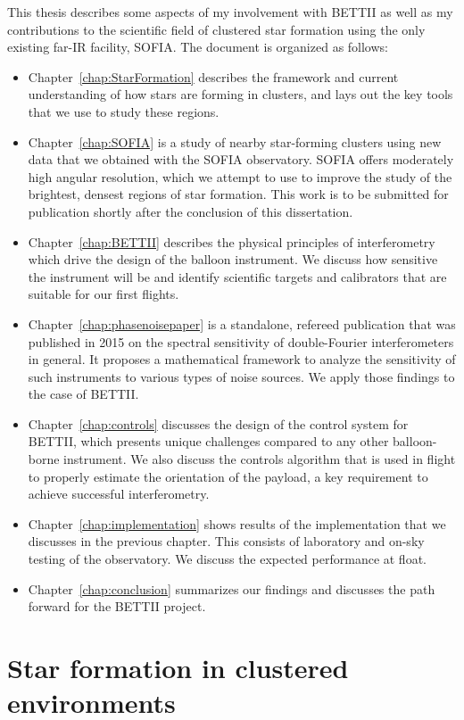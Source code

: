 This thesis describes some aspects of my involvement with BETTII as well as my contributions to the scientific field of clustered star formation using the only existing far-IR facility, SOFIA. The document is organized as follows:
\begin{itemize}
\item Chapter~\ref{chap:StarFormation} describes the framework and current understanding of how stars are forming in clusters, and lays out the key tools that we use to study these regions.
\item Chapter~\ref{chap:SOFIA} is a study of nearby star-forming clusters using new data that we obtained with the SOFIA observatory. SOFIA offers moderately high angular resolution, which we attempt to use to improve the study of the brightest, densest regions of star formation. This work is to be submitted for publication shortly after the conclusion of this dissertation. 
\item Chapter~\ref{chap:BETTII} describes the physical principles of interferometry which drive the design of the balloon instrument. We discuss how sensitive the instrument will be and identify scientific targets and calibrators that are suitable for our first flights.
\item Chapter~\ref{chap:phasenoisepaper} is a standalone, refereed publication that was published in 2015 on the spectral sensitivity of double-Fourier interferometers in general. It proposes a mathematical framework to analyze the sensitivity of such instruments to various types of noise sources. We apply those findings to the case of BETTII.
\item Chapter~\ref{chap:controls} discusses the design of the control system for BETTII, which presents unique challenges compared to any other balloon-borne instrument. We also discuss the controls algorithm that is used in flight to properly estimate the orientation of the payload, a key requirement to achieve successful interferometry.
\item Chapter~\ref{chap:implementation} shows results of the implementation that we discusses in the previous chapter. This consists of laboratory and on-sky testing of the observatory. We discuss the expected performance at float.
\item Chapter~\ref{chap:conclusion} summarizes our findings and discusses the path forward for the BETTII project.
\end{itemize}


\chapter{Star formation in clustered environments} %

